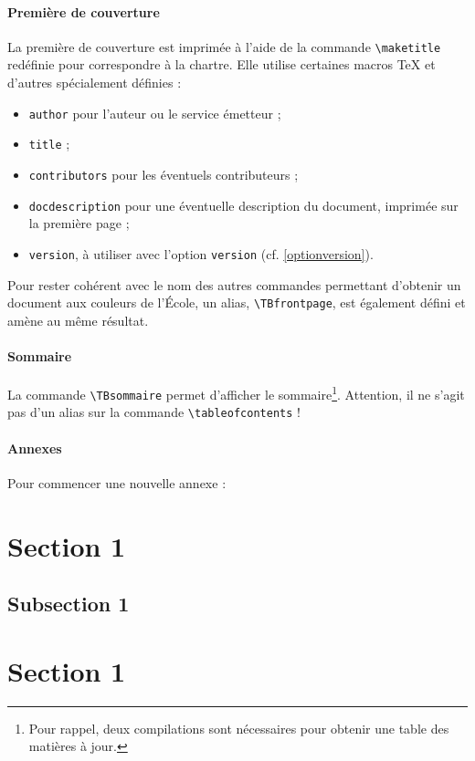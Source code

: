 \paragraph{Première de couverture}

La première de couverture est imprimée à l'aide de la commande \verb!\maketitle! redéfinie pour correspondre à la chartre. Elle utilise certaines macros \TeX{} et d'autres spécialement définies :
\begin{itemize}
	\item \texttt{author} pour l'auteur ou le service émetteur ;
	\item \texttt{title} ;
	\item \texttt{contributors} pour les éventuels contributeurs ;
	\item \texttt{docdescription} pour une éventuelle description du document, imprimée sur la première page ;
	\item \texttt{version}, à utiliser avec l'option \texttt{version} (cf. \ref{optionversion}).
\end{itemize}\bigskip

Pour rester cohérent avec le nom des autres commandes permettant d'obtenir un document aux couleurs de l'École, un alias, \verb!\TBfrontpage!, est également défini et amène au même résultat.

\paragraph{Sommaire}

La commande \verb!\TBsommaire! permet d'afficher le sommaire\footnote{Pour rappel, deux compilations sont nécessaires pour obtenir une table des matières à jour.}. Attention, il ne s'agit pas d'un alias sur la commande \verb!\tableofcontents! !

\paragraph{Annexes}
\label{annexe}

Pour commencer une nouvelle annexe : 
\begin{latex}
	\appendix %
	
	\section{Section 1} %
		\subsection{Subsection 1} %
	
	\section{Section 1} %
\end{latex}

